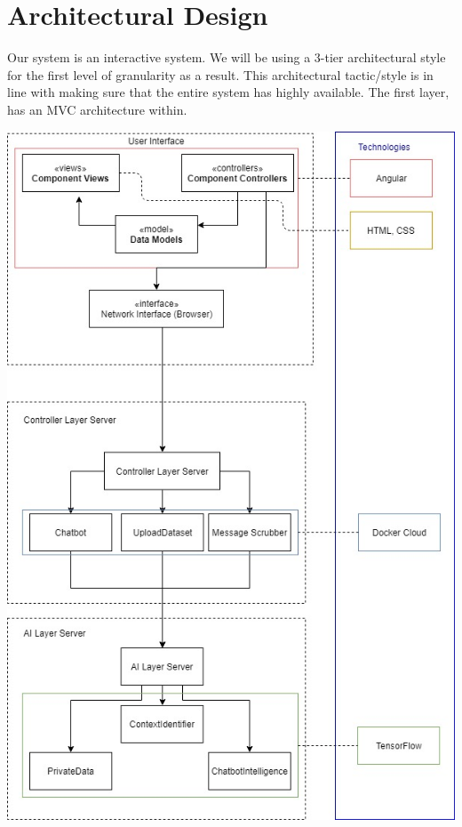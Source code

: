 \documentclass[11pt]{article}
\begin{document}
\section{Architectural Design}
Our system is an interactive system. We will be using a 3-tier architectural style for the first level of granularity as a result. This architectural tactic/style is in line with making sure that the entire system has highly available. The first layer, has an MVC architecture within.

 \includegraphics[width=1.0\textwidth]{../../images/Botic_Simplified_Architectural_Design.jpg}
\end{document}
